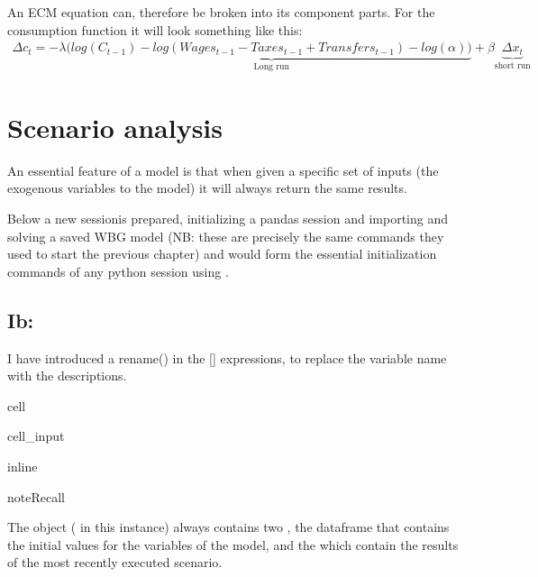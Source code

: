 \documentclass[letterpaper,10pt,english]{jupyterBook}
\begin{document}
\sphinxAtStartPar
An ECM equation can, therefore be broken into its component parts.  For the consumption function it will look something like this:
\begin{equation*}
\begin{split}\Delta c_t = -\lambda (\underbrace{
        log(C_{t-1})-log(Wages_{t-1}-Taxes_{t-1}+Transfers_{t-1}) -log(\alpha))}  _\text{Long run}
+\beta \underbrace{\Delta x_t}_\text{short run}\end{split}
\end{equation*}
\sphinxstepscope


\chapter{Scenario analysis}
\label{\detokenize{content/05_WBModels/ScenarioAnalysis:scenario-analysis}}\label{\detokenize{content/05_WBModels/ScenarioAnalysis::doc}}
\sphinxAtStartPar
An essential feature of a model is that when given a specific set of inputs (the exogenous variables to the model) it will always return the same results.

\sphinxAtStartPar
Below a new  sessionis prepared, initializing a pandas session and importing and solving a saved WBG model (NB: these are precisely the same commands they used to start the previous chapter) and would form the essential initialization commands of any python session using .


\section{Ib:}
\label{\detokenize{content/05_WBModels/ScenarioAnalysis:ib}}
\sphinxAtStartPar
I have introduced a rename() in the {[}{]} expressions, to replace the variable name with the descriptions.

\begin{sphinxuseclass}{cell}\begin{sphinxVerbatimInput}

\begin{sphinxuseclass}{cell_input}
\begin{sphinxVerbatim}[commandchars=\\\{\}]
 inline
\end{sphinxVerbatim}

\end{sphinxuseclass}\end{sphinxVerbatimInput}

\end{sphinxuseclass}
\begin{sphinxadmonition}{note}{Recall}

\sphinxAtStartPar
The  object ( in this instance) always contains two , the  dataframe that contains the initial values for the variables of the model, and the  which contain the results of the most recently executed scenario.
\end{sphinxadmonition}
\end{document}
